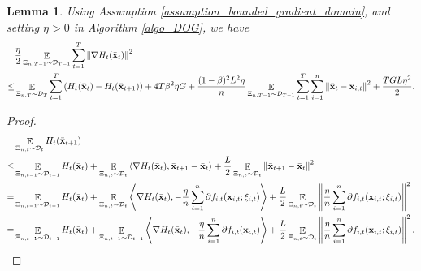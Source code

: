 \documentclass{article}
\newtheorem{Lemma}{\bf{Lemma}}
\begin{document}
\begin{Lemma}
\label{lemma_gradient_norm_bound}
Using Assumption \ref{assumption_bounded_gradient_domain}, and setting $\eta>0$ in Algorithm \ref{algo_DOG}, we have 
\begin{align}
& \frac{\eta}{2} \mathop{\mathbb{E}}_{ \Xi_{n,T-1} \sim \mathcal{D}_{T-1} }\sum_{t=1}^T \left\lVert\nabla H_t(\bar{{\bf x}}_t)\right\rVert^2 \\ \nonumber
\le & \mathop{\mathbb{E}}_{ \Xi_{n,T} \sim \mathcal{D}_{T} } \sum_{t=1}^T  \left( H_t(\bar{{\bf x}}_t) - H_t(\bar{{\bf x}}_{t+1}) \right) + 4T\beta^2 \eta G + \frac{(1-\beta)^2L^2 \eta}{n}\mathop{\mathbb{E}}_{ \Xi_{n,T-1} \sim \mathcal{D}_{T-1} }\sum_{t=1}^T\sum_{i=1}^n \left\lVert \bar{{\bf x}}_t - {\bf x}_{i,t} \right\rVert^2 + \frac{TGL\eta^2}{2}.
\end{align}
\end{Lemma}
\begin{proof}

\begin{align}
\nonumber
& \mathop{\mathbb{E}}_{ \Xi_{n,t} \sim \mathcal{D}_{t} } H_t(\bar{{\bf x}}_{t+1}) \\ \nonumber
\le & \mathop{\mathbb{E}}_{ \Xi_{n,t-1} \sim \mathcal{D}_{t-1} } H_t(\bar{{\bf x}}_t) + \mathop{\mathbb{E}}_{ \Xi_{n,t} \sim \mathcal{D}_{t} }\left\langle\nabla H_t(\bar{{\bf x}}_t), \bar{{\bf x}}_{t+1} - \bar{{\bf x}}_t \right\rangle + \frac{L}{2}\mathop{\mathbb{E}}_{ \Xi_{n,t} \sim \mathcal{D}_{t} }\left\lVert\bar{{\bf x}}_{t+1} - \bar{{\bf x}}_t\right\rVert^2 \\ \nonumber
= & \mathop{\mathbb{E}}_{ \Xi_{n,t-1} \sim \mathcal{D}_{t-1} } H_t(\bar{{\bf x}}_t) + \mathop{\mathbb{E}}_{ \Xi_{n,t} \sim \mathcal{D}_{t} }\left\langle\nabla H_t(\bar{{\bf x}}_t), -\frac{\eta}{n}\sum_{i=1}^n \partial f_{i,t}({\bf x}_{i,t};\xi_{i,t}) \right\rangle + \frac{L}{2} \mathop{\mathbb{E}}_{ \Xi_{n,t} \sim \mathcal{D}_{t} }\left\lVert\frac{\eta}{n}\sum_{i=1}^n \partial f_{i,t}({\bf x}_{i,t};\xi_{i,t})\right\rVert^2 \\ \label{equa_lemma_gradient_norm_temp0}
= & \mathop{\mathbb{E}}_{ \Xi_{n,t-1} \sim \mathcal{D}_{t-1} } H_t(\bar{{\bf x}}_t) + \mathop{\mathbb{E}}_{ \Xi_{n,t-1} \sim \mathcal{D}_{t-1} }\left\langle\nabla H_t(\bar{{\bf x}}_t), -\frac{\eta}{n}\sum_{i=1}^n \partial f_{i,t}({\bf x}_{i,t}) \right\rangle + \frac{L}{2} \mathop{\mathbb{E}}_{ \Xi_{n,t} \sim \mathcal{D}_{t} }\left\lVert\frac{\eta}{n}\sum_{i=1}^n \partial f_{i,t}({\bf x}_{i,t};\xi_{i,t})\right\rVert^2.
\end{align}



\end{proof}
\end{document}
